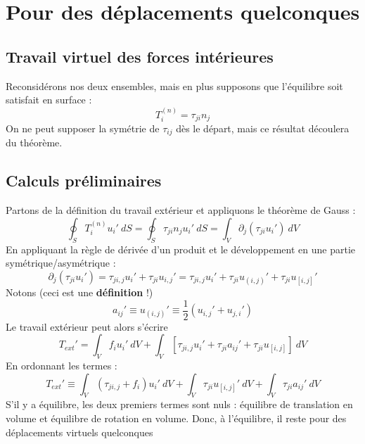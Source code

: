 \section{Pour des déplacements quelconques}
	\subsection{Travail virtuel des forces intérieures}
	Reconsidérons nos deux ensembles, mais en plus supposons que l'équilibre soit 
	satisfait en surface :
	\begin{equation}
	T_i^{(n)} = \tau_{ji}n_j
	\end{equation}
	\danger On ne peut supposer la symétrie de $\tau_{ij}$ dès le départ, mais 
	ce résultat découlera du théorème.
	
	\subsection{Calculs préliminaires}
	Partons de la définition du travail extérieur et appliquons le théorème de 
	Gauss :
	\begin{equation}
	\oint_S T_i^{(n)}u_i'\ dS = \oint_S \tau_{ji}n_ju_i'\ dS = \int_V \partial_j
	(\tau_{ji}u_i')\ dV
	\end{equation}
	En appliquant la règle de dérivée d'un produit et le développement en une 
	partie symétrique/asymétrique :
	\begin{equation}
	\partial_j(\tau_{ji}u_i') = \tau_{ji,j}u_i'+\tau_{ji}u_{i,j}' = \tau_{ji,j}
	u_i' + \tau_{ji}u_{(i,j)}'+\tau_{ji}u_{[i,j]}'
	\end{equation}
	Notons (ceci est une \textbf{définition} !)
	\begin{equation}
	a_{ij}' \equiv u_{(i,j)}' \equiv \dfrac{1}{2}(u_{i,j}'+u_{j,i}')
	\end{equation}
	Le travail extérieur peut alors s'écrire
	\begin{equation}
	T_{ext}' = \int_V f_iu_i'\ dV + \int_V [\tau_{ji,j}u_i'+\tau_{ji}a_{ij}'+
	\tau_{ji}u_{[i,j]}]\ dV
	\end{equation}
	En ordonnant les termes :
	\begin{equation}
	T_{ext}' \equiv \int_V(\tau_{ji,j}+f_i)u_i'\ dV + \int_V\tau_{ji}u_{[i,j]}'\ 
	dV + \int_V\tau_{ji}a_{ij}'\ dV
	\end{equation}
	S'il y a équilibre, les deux premiers termes sont nuls : équilibre de 
	translation en volume et équilibre de rotation en volume. Donc, à 
	l'équilibre, il reste pour des déplacements virtuels quelconques 
